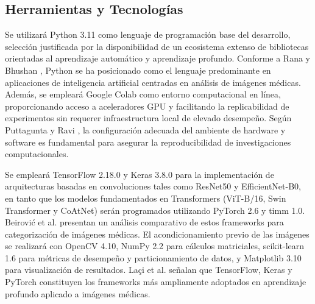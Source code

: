 \subsection{Herramientas y Tec\-no\-lo\-gí\-as}
\label{sec:tools_technologies}

Se utilizará Python 3.11 como lenguaje de programación base del desarrollo, selección justificada por la disponibilidad de un ecosistema extenso de bibliotecas orientadas al aprendizaje automático y aprendizaje profundo. Conforme a Rana y Bhushan \cite{Rana2022}, Python se ha posicionado como el lenguaje predominante en aplicaciones de inteligencia artificial centradas en análisis de imágenes médicas. Además, se empleará Google Colab como entorno computacional en línea, proporcionando acceso a aceleradores GPU y facilitando la replicabilidad de experimentos sin requerer infraestructura local de elevado desempeño. Según Puttagunta y Ravi \cite{Puttagunta2021}, la configuración adecuada del ambiente de hardware y software es fundamental para asegurar la reproducibilidad de investigaciones computacionales.

Se empleará TensorFlow 2.18.0 y Keras 3.8.0 para la implementación de arquitecturas basadas en convoluciones tales como ResNet50 y EfficientNet-B0, en tanto que los modelos fundamentados en Transformers (ViT-B/16, Swin Transformer y CoAtNet) serán programados utilizando PyTorch 2.6 y timm 1.0. Beirović et al. \cite{Beirovic2025} presentan un análisis comparativo de estos frameworks para categorización de imágenes médicas. El acondicionamiento previo de las imágenes se realizará con OpenCV 4.10, NumPy 2.2 para cálculos matriciales, scikit-learn 1.6 para métricas de desempeño y particionamiento de datos, y Matplotlib 3.10 para visualización de resultados. Laçi et al. \cite{Laci2025} señalan que TensorFlow, Keras y PyTorch constituyen los frameworks más ampliamente adoptados en aprendizaje profundo aplicado a imágenes médicas.
